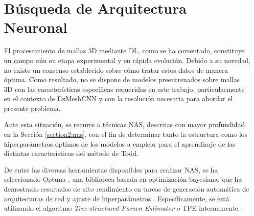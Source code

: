 \section{Búsqueda de Arquitectura Neuronal}
\label{section4:nas}
El procesamiento de mallas 3D mediante DL, como se ha comentado, constituye un campo aún en etapa experimental y en rápida evolución. Debido a su novedad, no existe un consenso establecido sobre cómo tratar estos datos de manera óptima. Como resultado, no se dispone de modelos preentrenados sobre mallas 3D con las características específicas requeridas en este trabajo, particularmente en el contexto de ExMeshCNN y con la resolución necesaria para abordar el presente problema.

Ante esta situación, se recurre a técnicas NAS, descritas con mayor profundidad en la Sección \ref{section2:nas}, con el fin de determinar tanto la estructura como los hiperparámetros óptimos de los modelos a emplear para el aprendizaje de las distintas características del método de Todd.

De entre las diversas herramientas disponibles para realizar NAS, se ha seleccionado Optuna \cite{optuna_2019}, una biblioteca basada en optimización bayesiana, que ha demostrado resultados de alto rendimiento en tareas de generación automática de arquitecturas de red y ajuste de hiperparámetros \cite{pizurica_generic_2024}. Específicamente, se está utilizando el algoritmo \textit{Tree-structured Parzen Estimator} o TPE internamente.


